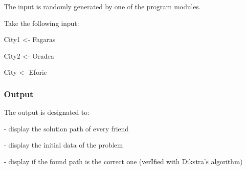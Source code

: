 \documentclass[12pt]{article}
\begin{document}
\begin{justify}
The input is randomly generated by one of the program modules. 
\end{justify}\par

\begin{justify}
\tab Take the following input:
\end{justify}\par

\begin{justify}
\tab City1 <- Fagaras
\end{justify}\par

\begin{justify}
\tab City2 <- Oradea
\end{justify}\par

\begin{justify}
\tab City <- Eforie
\end{justify}\par

\subsubsection*{Output}
\begin{adjustwidth}{0.5in}{0.0in}
\begin{justify}
The output is designated to:
\end{justify}\par

\end{adjustwidth}

\begin{adjustwidth}{0.5in}{0.0in}
\begin{justify}
- display the solution path of every friend
\end{justify}\par

\end{adjustwidth}

\begin{adjustwidth}{0.5in}{0.0in}
\begin{justify}
- display the initial data of the problem 
\end{justify}\par

\end{adjustwidth}

\begin{adjustwidth}{0.5in}{0.0in}
\begin{justify}
- display if the found path is the correct one (verIfied with Dikstra’s algorithm) 
\end{justify}\par

\end{adjustwidth}
\end{document}
